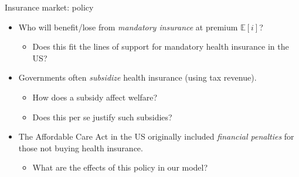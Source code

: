\documentclass[bigger]{beamer}
\begin{document}
\begin{frame}[label={sec:orgf229cb3}]{Insurance market: policy}
\begin{itemize}
\item Who will benefit/lose from \emph{mandatory insurance} at premium \(\mathbb{E}[i]\)?

\begin{itemize}
\item Does this fit the lines of support for mandatory health insurance in the US?
\end{itemize}
\item Governments often \emph{subsidize} health insurance (using tax revenue).
\begin{itemize}
\item How does a subsidy affect welfare?
\item Does this per se justify such subsidies?
\end{itemize}
\end{itemize}

\begin{itemize}
\item The Affordable Care Act in the US originally included \emph{financial penalties} for those not buying health insurance.
\begin{itemize}
\item What are the effects of this policy in our model?
\end{itemize}
\end{itemize}
\end{frame}
\end{document}
